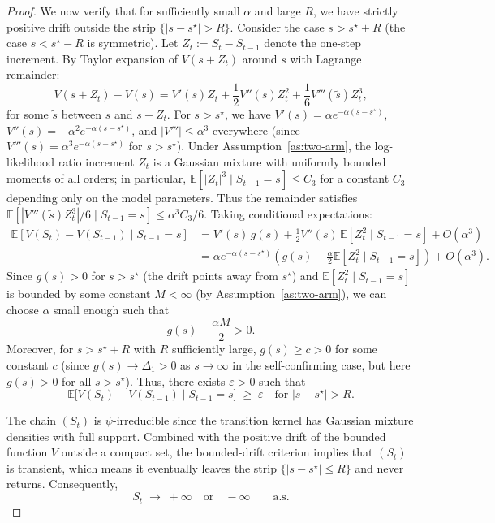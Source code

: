 \documentclass[12pt]{article}
\newcommand{\E}{\mathbb{E}}
\begin{document}
\begin{proof}
We now verify that for sufficiently small $\alpha$ and large $R$, we have strictly positive drift outside the strip $\{|s - s^\star| > R\}$.
Consider the case $s > s^\star + R$ (the case $s < s^\star - R$ is symmetric).
Let $Z_t := S_t - S_{t-1}$ denote the one-step increment.
By Taylor expansion of $V(s + Z_t)$ around $s$ with Lagrange remainder:
\[
V(s + Z_t) - V(s) = V'(s) Z_t + \frac{1}{2} V''(s) Z_t^2 + \frac{1}{6} V'''(\tilde{s}) Z_t^3,
\]
for some $\tilde{s}$ between $s$ and $s + Z_t$.
For $s > s^\star$, we have $V'(s) = \alpha e^{-\alpha(s - s^\star)}$, $V''(s) = -\alpha^2 e^{-\alpha(s - s^\star)}$, and $|V'''| \leq \alpha^3$ everywhere (since $V'''(s) = \alpha^3 e^{-\alpha(s-s^\star)}$ for $s > s^\star$). Under Assumption~\ref{as:two-arm}, the log-likelihood ratio increment $Z_t$ is a Gaussian mixture with uniformly bounded moments of all orders; in particular, $\E[|Z_t|^3 \mid S_{t-1} = s] \leq C_3$ for a constant $C_3$ depending only on the model parameters. Thus the remainder satisfies $\E[|V'''(\tilde{s}) Z_t^3|/6 \mid S_{t-1} = s] \leq \alpha^3 C_3/6$.
Taking conditional expectations:
\begin{align*}
\E[V(S_t) - V(S_{t-1}) \mid S_{t-1} = s]
&= V'(s) \, g(s) + \frac{1}{2} V''(s) \, \E[Z_t^2 \mid S_{t-1} = s] + O(\alpha^3) \\
&= \alpha e^{-\alpha(s - s^\star)} \left( g(s) - \frac{\alpha}{2} \E[Z_t^2 \mid S_{t-1} = s] \right) + O(\alpha^3).
\end{align*}
Since $g(s) > 0$ for $s > s^\star$ (the drift points away from $s^\star$) and $\E[Z_t^2 \mid S_{t-1} = s]$ is bounded by some constant $M < \infty$ (by Assumption~\ref{as:two-arm}), we can choose $\alpha$ small enough such that
\[
g(s) - \frac{\alpha M}{2} > 0.
\]
Moreover, for $s > s^\star + R$ with $R$ sufficiently large, $g(s) \ge c > 0$ for some constant $c$ (since $g(s) \to \Delta_1 > 0$ as $s \to \infty$ in the self-confirming case, but here $g(s) > 0$ for all $s > s^\star$).
Thus, there exists $\varepsilon > 0$ such that
\[
\E\!\bigl[V(S_{t})-V(S_{t-1})\mid S_{t-1}=s\bigr]\;\ge\;\varepsilon
\quad\text{for }|s-s^\star|>R.
\]

The chain $(S_t)$ is $\psi$-irreducible since the transition kernel has Gaussian mixture densities with full support. Combined with the positive drift of the bounded function $V$ outside a compact set, the bounded-drift criterion
\citep[Thm.~8.4.2]{meynMarkovChainsStochastic1993} implies that $(S_t)$ is transient, which means it eventually leaves the strip $\{|s-s^\star|\le R\}$ and never returns.
Consequently,
\[
S_t\;\longrightarrow\;+\infty\quad\text{or}\quad-\infty
\qquad\text{a.s.}
\]


\end{proof}
\end{document}
